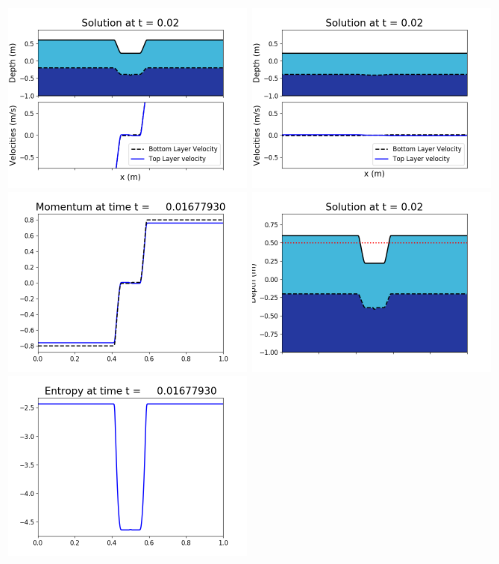 \documentclass[11pt]{article}
\begin{document}
\vskip 10pt 
\includegraphics[width=0.475\textwidth]{frame0047fig1001.png}
\includegraphics[width=0.475\textwidth]{frame0047fig1002.png}
\vskip 10pt 
\includegraphics[width=0.475\textwidth]{frame0047fig1003.png}
\includegraphics[width=0.475\textwidth]{frame0047fig1006.png}
\vskip 10pt 
\includegraphics[width=0.475\textwidth]{frame0047fig1007.png}
\end{document}
